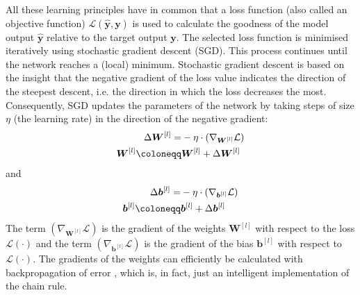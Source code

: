 All these learning principles have in common that a loss function  (also called an objective function) $\mathcal{L}(\boldsymbol{\hat{y}}, \boldsymbol{y})$ is used to calculate the goodness of the model output $\boldsymbol{\hat{y}}$ relative to the target output $\boldsymbol{y}$.
The selected loss function is minimised iteratively using stochastic gradient descent (SGD). This process continues until the network reaches a (local) minimum.
Stochastic gradient descent is based on the insight that the negative gradient of the loss value indicates the direction of the steepest descent, i.e. the direction in which the loss decreases the most. Consequently, SGD updates the parameters of the network by taking steps of size $\eta$ (the learning rate) in the direction of the negative gradient:
%
\begin{align}\eqlbl{sgd}
	\begin{aligned}
		\Delta \boldsymbol{W}^{[l]} = & -\eta \cdot \left( \nabla_{\boldsymbol{W}^{[l]}} \mathcal{L} \right)\\
		\boldsymbol{W}^{[l]} \coloneqq & \boldsymbol{W}^{[l]} + \Delta \boldsymbol{W}^{[l]}
	\end{aligned}
\end{align}
%
and
%	
\begin{align}\eqlbl{sgd2}	
	\begin{aligned}
		\Delta \boldsymbol{b}^{[l]} = & -\eta \cdot \left( \nabla_{\boldsymbol{b}^{[l]}} \mathcal{L} \right)\\
		\boldsymbol{b}^{[l]} \coloneqq & \boldsymbol{b}^{[l]} + \Delta \boldsymbol{b}^{[l]}
	\end{aligned}
\end{align}
%
The term $\left( \nabla_{\boldsymbol{W}^{[l]}} \mathcal{L} \right)$ is the gradient of the weights $\boldsymbol{W}^{[l]}$  with respect to the loss $\mathcal{L}(\cdot)$ and the term $\left( \nabla_{\boldsymbol{b}^{[l]}} \mathcal{L} \right)$ is the gradient of the bias \(\boldsymbol{b}^{[l]}\)  with respect to $\mathcal{L}(\cdot)$.
The gradients of the weights can efficiently be calculated with backpropagation of error , which is, in fact, just an intelligent implementation of the chain rule.

